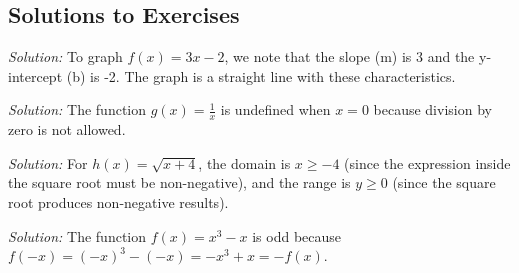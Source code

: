 \documentclass[a4paper,12pt]{book}
\newenvironment{solution}[1][]
{\par\noindent\textit{Solution:} \rmfamily}{\medskip}
\begin{document}

\subsection{Solutions to Exercises}

\begin{solution}[1]
To graph \( f(x) = 3x - 2 \), we note that the slope (m) is 3 and the y-intercept (b) is -2. The graph is a straight line with these characteristics.

\end{solution}

\begin{solution}[2]
The function \( g(x) = \frac{1}{x} \) is undefined when \( x = 0 \) because division by zero is not allowed.
\end{solution}

\begin{solution}[3]
For \( h(x) = \sqrt{x + 4} \), the domain is \( x \geq -4 \) (since the expression inside the square root must be non-negative), and the range is \( y \geq 0 \) (since the square root produces non-negative results).
\end{solution}

\begin{solution}[4]
The function \( f(x) = x^3 - x \) is odd because \( f(-x) = (-x)^3 - (-x) = -x^3 + x = -f(x) \).
\end{solution}
\end{document}
